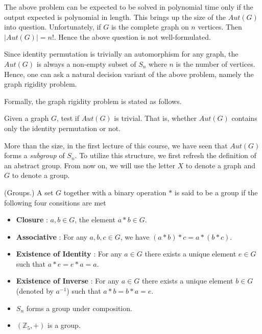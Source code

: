 The above problem can be expected to be solved in polynomial time only if the output expected is polynomial in length. This brings up the size of the $Aut(G)$ into question. Unfortunately, if $G$ is the complete graph on $n$ vertices. Then $|Aut(G)|=n!$. Hence the above question is not well-formulated.

Since identity permutation is trivially an automorphism for any graph, the $Aut(G)$ is always a non-empty subset of $S_n$ where $n$ is the number of vertices. Hence, one can ask a natural decision variant of the above problem, namely the graph rigidity problem.

Formally, the graph rigidity problem is stated as follows.
\begin{problem}
Given a graph $G$, test if $Aut(G)$ is trivial. That is, whether $Aut(G)$ contains only the identity permutation or not.
\end{problem}

More than the size, in the first lecture of this course, we have seen that $Aut(G)$ forms a \textit{subgroup} of $S_n$. To utilize this structure, we first refresh the definition of an abstract group. From now on, we will use the letter $X$ to denote a graph and $G$ to denote a group. 

\begin{definition}(Groups.)
A set $G$ together with a binary operation $*$ is said to be a group if the following four consitions are met
\begin{itemize}
\item \textbf{Closure} : $a,b\in G$, the element $a*b\in G$.
\item \textbf{Associative} : For any $a,b,c\in G$, we have $(a*b)*c = a*(b*c)$.
\item \textbf{Existence of Identity} : For any $a\in G$ there exists a unique element $e\in G$ such that $a*e =e*a =a$. 
\item \textbf{Existence of Inverse} : For any $a\in G$ there exists a unique element $b\in G$(denoted by $a^{-1}$) such that $a*b =b*a =e$. 
\end{itemize}
\end{definition}

\begin{example}
\begin{itemize}
\item $S_n$ forms a group under composition.
\item $(\mathbb{Z}_5,+)$ is a group.
\end{itemize}
\end{example}

